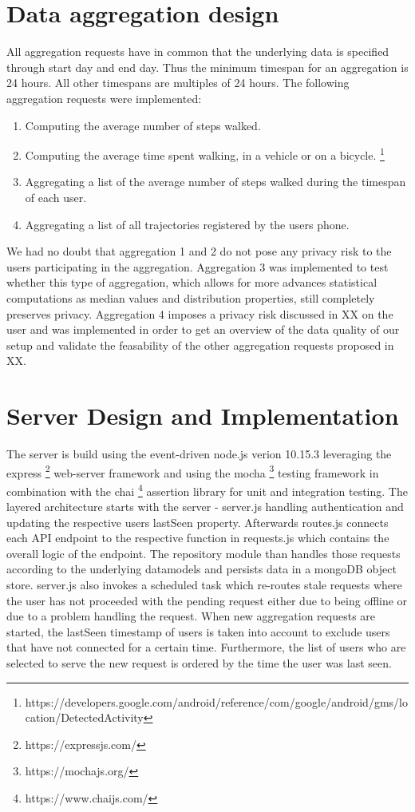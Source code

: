 \section{Data aggregation design}
All aggregation requests have in common that the underlying data is specified through start day and end day. Thus the minimum timespan for an aggregation is 24 hours. All other timespans are multiples of 24 hours.
The following aggregation requests were implemented:
\begin{enumerate}
	\item Computing the average number of steps walked.
	\item Computing the average time spent walking, in a vehicle or on a bicycle. \footnote{https://developers.google.com/android/reference/com/google/android/gms/location/DetectedActivity}
	\item Aggregating a list of the average number of steps walked during the timespan of each user.
	\item Aggregating a list of all trajectories registered by the users phone.
\end{enumerate}

We had no doubt that aggregation 1 and 2 do not pose any privacy risk to the users participating in the aggregation. Aggregation 3 was implemented to test whether this type of aggregation, which allows for more advances statistical computations as median values and distribution properties, still completely preserves privacy.
Aggregation 4 imposes a privacy risk discussed in XX on the user and was implemented in order to get an overview of the data quality of our setup and validate the feasability of the other aggregation requests proposed in XX.

\section{Server Design and Implementation}
The server is build using the event-driven node.js verion 10.15.3 leveraging the express \footnote{https://expressjs.com/} web-server framework and using the mocha \footnote{https://mochajs.org/} testing framework in combination with the chai \footnote{https://www.chaijs.com/} assertion library for unit and integration testing. The layered architecture starts with the server - server.js handling authentication and updating the respective users lastSeen property. Afterwards routes.js connects each API endpoint to the respective function in requests.js which contains the overall logic of the endpoint. The repository module than handles those requests according to the underlying datamodels and persists data in a mongoDB object store. server.js also invokes a scheduled task which re-routes stale requests where the user has not proceeded with the pending request either due to being offline or due to a problem handling the request. When new aggregation requests are started, the lastSeen timestamp of users is taken into account to exclude users that have not connected for a certain time. Furthermore, the list of users who are selected to serve the new request is ordered by the time the user was last seen.


